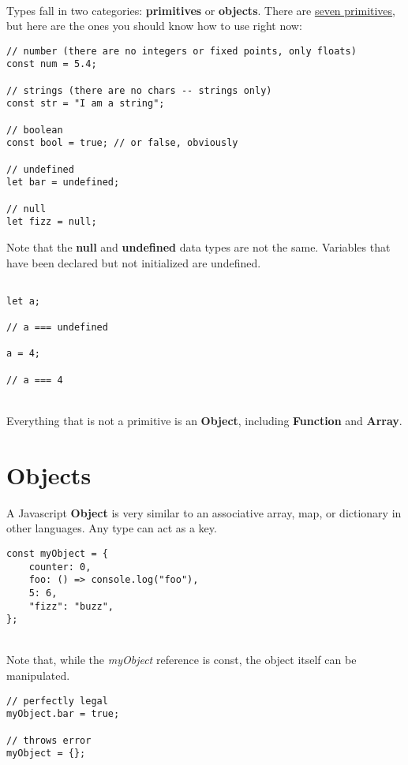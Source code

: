\documentclass{article}
\begin{document}
\noindent
\\
Types fall in two categories: \textbf{primitives} or \textbf{objects}. There are \href{https://developer.mozilla.org/en-US/docs/Web/JavaScript/Language_overview#data_types}{seven primitives}, but here are the ones you should know how to use right now:
\begin{verbatim}
// number (there are no integers or fixed points, only floats)
const num = 5.4;

// strings (there are no chars -- strings only)
const str = "I am a string";

// boolean
const bool = true; // or false, obviously

// undefined
let bar = undefined;

// null
let fizz = null;
\end{verbatim}

\noindent
Note that the \textbf{null} and \textbf{undefined} data types are not the same. Variables that have been declared but not initialized are undefined.

\begin{verbatim}

let a;

// a === undefined

a = 4;

// a === 4

\end{verbatim}

\noindent
\\
Everything that is not a primitive is an \textbf{Object}, including \textbf{Function} and \textbf{Array}.

\section{Objects}

A Javascript \textbf{Object} is very similar to an associative array, map, or dictionary in other languages. Any type can act as a key.

\begin{verbatim}
const myObject = {
	counter: 0,
	foo: () => console.log("foo"),
	5: 6,
	"fizz": "buzz",
};
\end{verbatim}

\noindent
\\
Note that, while the \textit{myObject} reference is const, the object itself can be manipulated.

\begin{verbatim}
// perfectly legal
myObject.bar = true;

// throws error
myObject = {};
\end{verbatim}
\end{document}
